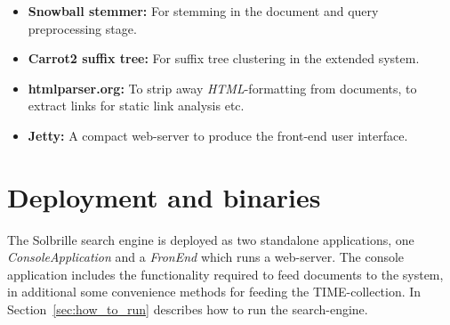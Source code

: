 \begin{itemize}
	\item \textbf{Snowball stemmer:} For stemming in the document and query preprocessing stage.
	\item \textbf{Carrot2 suffix tree:} For suffix tree clustering in the extended system.
	\item \textbf{htmlparser.org:} To strip away \emph{HTML}-formatting from documents, to extract links for static link analysis etc.
	\item \textbf{Jetty:} A compact web-server to produce the front-end user interface.
\end{itemize}

\section{Deployment and binaries}\label{sec:deployment_and_binaries}
The Solbrille search engine is deployed as two standalone applications, one \emph{ConsoleApplication} and a \emph{FronEnd} which runs a web-server. The console application includes the functionality required to feed documents to the system, in additional some convenience methods for feeding the TIME-collection. In Section~\ref{sec:how_to_run} describes how to run the search-engine.